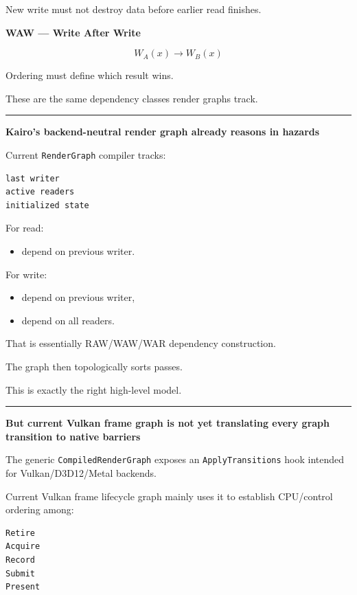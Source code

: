 New write must not destroy data before earlier read finishes.

\textbf{WAW --- Write After Write}

\[
W_A(x)
\rightarrow
W_B(x)
\]

Ordering must define which result wins.

These are the same dependency classes render graphs track.

\begin{center}\rule{0.5\linewidth}{0.5pt}\end{center}

\textbf{Kairo's backend-neutral render graph already reasons in hazards}

Current \texttt{RenderGraph} compiler tracks:

\begin{verbatim}
last writer
active readers
initialized state
\end{verbatim}

For read:

\begin{itemize}
\tightlist
\item
  depend on previous writer.
\end{itemize}

For write:

\begin{itemize}
\tightlist
\item
  depend on previous writer,
\item
  depend on all readers.
\end{itemize}

That is essentially RAW/WAW/WAR dependency construction.

The graph then topologically sorts passes.

This is exactly the right high-level model.

\begin{center}\rule{0.5\linewidth}{0.5pt}\end{center}

\textbf{But current Vulkan frame graph is not yet translating every graph transition to native barriers}

The generic \texttt{CompiledRenderGraph} exposes an \texttt{ApplyTransitions} hook intended for Vulkan/D3D12/Metal backends.

Current Vulkan frame lifecycle graph mainly uses it to establish CPU/control ordering among:

\begin{verbatim}
Retire
Acquire
Record
Submit
Present
\end{verbatim}

